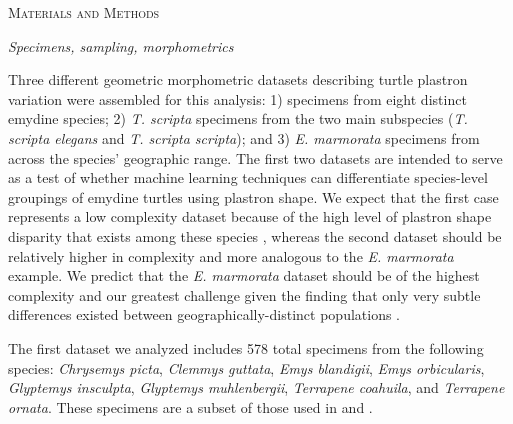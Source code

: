 \documentclass[12pt,letterpaper]{article}
\renewcommand{\section}[1]{%
\bigskip
\begin{center}
\begin{Large}
\normalfont\scshape #1
\medskip
\end{Large}
\end{center}}
\renewcommand{\subsection}[1]{%
\bigskip
\begin{center}
\begin{large}
\normalfont\itshape #1
\end{large}
\end{center}}
\begin{document}
\section{Materials and Methods}
\subsection{Specimens, sampling, morphometrics}
Three different geometric morphometric datasets describing turtle plastron variation were assembled for this analysis: 1) specimens from eight distinct emydine species; 2) \textit{T. scripta} specimens from the two main subspecies (\textit{T. scripta elegans} and \textit{T. scripta scripta}); and 3) \textit{E. marmorata} specimens from across the species' geographic range. The first two datasets are intended to serve as a test of whether machine learning techniques can differentiate species-level groupings of emydine turtles using plastron shape. We expect that the first case represents a low complexity dataset because of the high level of plastron shape disparity that exists among these species \citep{Angielczyk2011}, whereas the second dataset should be relatively higher in complexity and more analogous to the \textit{E. marmorata} example. We predict that the \textit{E. marmorata} dataset should be of the highest complexity and our greatest challenge given the finding that only very subtle differences existed between geographically-distinct populations \citep{Holland1992}.

The first dataset we analyzed includes 578 total specimens from the following species: \textit{Chrysemys picta}, \textit{Clemmys guttata}, \textit{Emys blandigii}, \textit{Emys orbicularis}, \textit{Glyptemys insculpta}, \textit{Glyptemys muhlenbergii}, \textit{Terrapene coahuila}, and \textit{Terrapene ornata}. These specimens are a subset of those used in \citet{Angielczyk2011} and \citet{Angielczyk2013a}.
\end{document}
